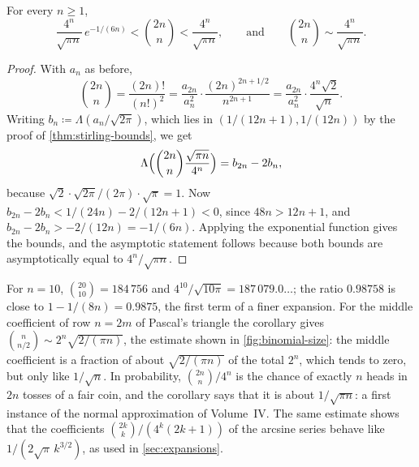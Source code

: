 \begin{corollary}
\label{cor:central-binomial}
For every $n\ge1$,
\[
\frac{4^n}{\sqrt{\pi n}}\,e^{-1/(6n)}<\binom{2n}n<\frac{4^n}{\sqrt{\pi n}},\qquad\text{and}\qquad\binom{2n}n\sim\frac{4^n}{\sqrt{\pi n}} .
\]
\end{corollary}

\begin{proof}
With $a_n$ as before,
\[
\binom{2n}n=\frac{(2n)!}{(n!)^2}=\frac{a_{2n}}{a_n^2}\cdot\frac{(2n)^{2n+1/2}}{n^{2n+1}}=\frac{a_{2n}}{a_n^2}\cdot\frac{4^n\sqrt2}{\sqrt n}.
\]
Writing $b_n\coloneqq\Lambda(a_n/\sqrt{2\pi})$, which lies in $(1/(12n+1),1/(12n))$ by the proof of \cref{thm:stirling-bounds}, we get
\[
\Lambda\Bigl(\binom{2n}n\frac{\sqrt{\pi n}}{4^n}\Bigr)=b_{2n}-2b_n ,
\]
because $\sqrt{2}\cdot\sqrt{2\pi}/(2\pi)\cdot\sqrt\pi=1$. Now $b_{2n}-2b_n<1/(24n)-2/(12n+1)<0$, since $48n>12n+1$, and $b_{2n}-2b_n>-2/(12n)=-1/(6n)$. Applying the exponential function gives the bounds, and the asymptotic statement follows because both bounds are asymptotically equal to $4^n/\sqrt{\pi n}$.
\end{proof}

For $n=10$, $\binom{20}{10}=184\,756$ and $4^{10}/\sqrt{10\pi}=187\,079.0\ldots$; the ratio $0.98758$ is close to $1-1/(8n)=0.9875$, the first term of a finer expansion. For the middle coefficient of row $n=2m$ of Pascal's triangle the corollary gives $\binom n{n/2}\sim2^n\sqrt{2/(\pi n)}$, the estimate shown in \cref{fig:binomial-size}: the middle coefficient is a fraction of about $\sqrt{2/(\pi n)}$ of the total $2^n$, which tends to zero, but only like $1/\sqrt n$. In probability, $\binom{2n}n/4^n$ is the chance of exactly $n$ heads in $2n$ tosses of a fair coin, and the corollary says that it is about $1/\sqrt{\pi n}$: a first instance of the normal approximation of Volume~IV. The same estimate shows that the coefficients $\binom{2k}k/(4^k(2k+1))$ of the arcsine series behave like $1/(2\sqrt\pi\,k^{3/2})$, as used in \cref{sec:expansions}.

